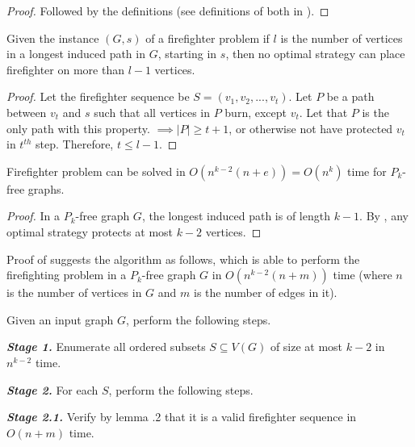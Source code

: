 \begin{proof}
    Followed by the definitions (see definitions of both in ).
\end{proof}

\begin{lemma}\label{lemma:firefighter-path-from-s}
Given the instance $(G, s)$ of a firefighter problem if $l$ is the number of vertices in a longest induced path in $G$, starting in $s$, then no optimal strategy can place firefighter on more than $l-1$ vertices. \cite{Fomin2016}
\end{lemma}

\begin{proof}
Let the firefighter sequence be $S=(v_1, v_2, . . ., v_t)$. Let $P$ be a path between $v_t$ and $s$ such that all vertices in $P$ burn, except $v_t$. Let that $P$ is the only path with this property. $\implies |P|\geq t+1$, or otherwise not have protected $v_t$ in $t^{th}$ step. Therefore, $t\leq l-1$.
\end{proof}

\begin{theorem}\label{theorem:firefight-P-k-free}
Firefighter problem can be solved in $O(n^{k-2}(n+e)) = O(n^k)$ time for $P_k$-free graphs. \cite{Fomin2016}
\end{theorem}

\begin{proof}
In a $P_k$-free graph $G$, the longest induced path is of length $k-1$. By , any optimal strategy protects at most $k-2$ vertices.
\end{proof}

Proof of  suggests the algorithm  as follows, which is able to perform the firefighting problem in a $P_k$-free graph $G$ in $O(n^{k-2}(n+m))$ time (where $n$ is the number of vertices in $G$ and $m$ is the number of edges in it).

\begin{algorithm}\label{algorithm:firefight-P-k-free}
    Given an input graph $G$, perform the following steps.
\end{algorithm}

\textbf{\textit{Stage 1.}} Enumerate all ordered subsets $S \subseteq V(G)$ of size at most $k-2$ in $n^{k-2}$ time.

\textbf{\textit{Stage 2.}} For each $S$, perform the following steps.

\textbf{\textit{Stage 2.1.}} Verify by lemma \thech.2 that it is a valid firefighter sequence in $O(n+m)$ time.

